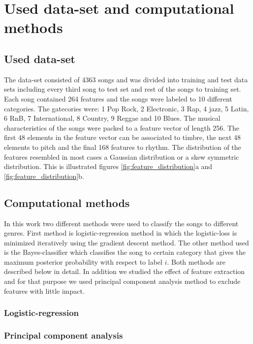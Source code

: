 \documentclass[aps,prb,10pt,twocolumn,groupedaddress]{revtex4-1}
\begin{document}
\section{Used data-set and computational methods}
\label{sec:methods}
\subsection{Used data-set}
\label{sec:used_data_set}
The data-set consisted of 4363 songs and was divided into training and test data
sets including every third song to test set and rest of the songs to training
set. Each song contained 264 features and the songs were labeled to 10
different categories. The gatecories were: 1 Pop Rock, 2 Electronic, 3 Rap,
4 jazz, 5 Latin, 6 RnB, 7 International, 8 Country, 9 Reggae and 10 Blues.
The musical characteristics of the songs were packed to a feature
vector of length 256. The first 48 elements in the feature vector can be
associated to timbre, the next 48 elements to pitch and the final 168 features
to rhythm. The distribution of the features resembled in most cases a Gaussian
distribution or a skew symmetric distribution. This is illustrated figures
\ref{fig:feature_distribution}a and \ref{fig:feature_distribution}b.


\subsection{Computational methods}
\label{sec:computational_methods}
In this work two different methods were used to classify the songs to different
genres. First method is logistic-regression method in which the logistic-loss
is minimized iteratively using the gradient descent method.
The other method used is the Bayes-classifier which classifies the song to
certain category that gives the maximum posterior probability with respect to
label $i$. Both methods are described below in detail. In addition we studied
the effect of feature extraction and for that purpose we used principal
component analysis method to exclude features with little impact. 
\subsubsection{Logistic-regression}

\subsubsection{Principal component analysis}
\end{document}
